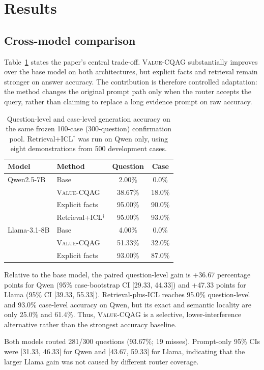 \documentclass{article}
\newcommand{\method}{\textsc{Value-CQAG}}
\begin{document}
\section{Results}
\subsection{Cross-model comparison}
Table~\ref{tab:main} states the paper's central trade-off. \method{} substantially improves over the base model on both architectures, but explicit facts and retrieval remain stronger on answer accuracy. The contribution is therefore controlled adaptation: the method changes the original prompt path only when the router accepts the query, rather than claiming to replace a long evidence prompt on raw accuracy.

\begin{table}[t]
\centering
\caption{Question-level and case-level generation accuracy on the same frozen 100-case (300-question) confirmation pool. Retrieval+ICL$^{\dagger}$ was run on Qwen only, using eight demonstrations from 500 development cases.}
\label{tab:main}
\small
\begin{tabular}{llcc}
\toprule
Model & Method & Question & Case \\
\midrule
Qwen2.5-7B & Base & 2.00\% & 0.0\% \\
& \method{} & 38.67\% & 18.0\% \\
& Explicit facts & 95.00\% & 90.0\% \\
 & Retrieval+ICL$^{\dagger}$ & 95.00\% & 93.0\% \\
Llama-3.1-8B & Base & 4.00\% & 0.0\% \\
& \method{} & 51.33\% & 32.0\% \\
& Explicit facts & 93.00\% & 87.0\% \\
\bottomrule
\end{tabular}
\end{table}

Relative to the base model, the paired question-level gain is +36.67 percentage points for Qwen (95\% case-bootstrap CI [29.33, 44.33]) and +47.33 points for Llama (95\% CI [39.33, 55.33]). Retrieval-plus-ICL reaches 95.0\% question-level and 93.0\% case-level accuracy on Qwen, but its exact and semantic locality are only 25.0\% and 61.4\%. Thus, \method{} is a selective, lower-interference alternative rather than the strongest accuracy baseline.

Both models routed 281/300 questions (93.67\%; 19 misses). Prompt-only 95\% CIs were [31.33, 46.33] for Qwen and [43.67, 59.33] for Llama, indicating that the larger Llama gain was not caused by different router coverage.
\end{document}
